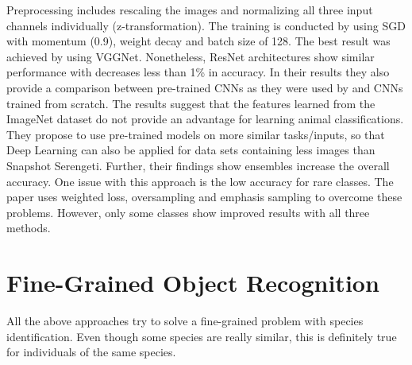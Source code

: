 \documentclass[electronic]{vgtc}             %
\begin{document}
	Preprocessing includes rescaling the images and normalizing all three input channels individually (z-transformation).
	The training is conducted by using SGD with momentum (0.9), weight decay and batch size of 128.
	The best result was achieved by using VGGNet.
	Nonetheless, ResNet architectures show similar performance with decreases less than 1\% in accuracy.
	In their results they also provide a comparison between pre-trained CNNs as they were used by \cite{Gomez:2016} and CNNs trained from scratch.
	The results suggest that the features learned from the ImageNet dataset do not provide an advantage for learning animal classifications.
	They propose to use pre-trained models on more similar tasks/inputs, so that Deep Learning can also be applied for data sets containing less images than Snapshot Serengeti. 
	Further, their findings show ensembles increase the overall accuracy. 
	One issue with this approach is the low accuracy for rare classes.
	The paper uses weighted loss, oversampling and emphasis sampling to overcome these problems. 
	However, only some classes show improved results with all three methods.
	
	\section{Fine-Grained Object Recognition}
	
	All the above approaches try to solve a fine-grained problem with species identification. 
	Even though some species are really similar, this is definitely true for individuals of the same species.
	
\end{document}
